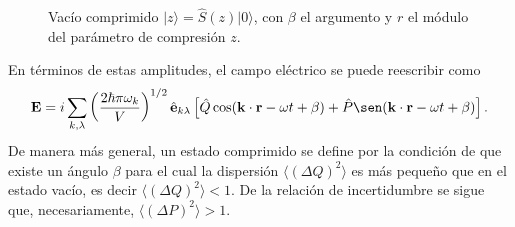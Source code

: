 \begin{figure}[!h]


  \caption{Vacío comprimido $\vert z \rangle = \hat{S}(z)\vert 0 \rangle$, con $\beta$ el argumento y $r$ el módulo del parámetro de compresión $z$.}
  \label{fig:squeezed-vacuum}
\end{figure}

En términos de estas amplitudes, el campo eléctrico se puede reescribir como
\begin{equation}
  \mathbf{E} = i \sum_{k,\lambda} \left( \frac{2\hbar \pi \omega_k}{V} \right)^{1/2} \hat{\mathbf{e}}_{k\lambda} \left[ \hat{Q}\cos(\mathbf{k}\cdot\mathbf{r} - \omega t + \beta) + \hat{P}\sen(\mathbf{k}\cdot\mathbf{r} - \omega t + \beta) \right].
\end{equation}
De manera más general, un estado comprimido se define por la condición de que existe un ángulo $\beta$ para el cual la dispersión $\langle (\Delta Q)^2 \rangle$ es más pequeño que en el estado vacío, es decir $\langle (\Delta Q)^2 \rangle < 1$. De la relación de incertidumbre se sigue que, necesariamente, $\langle (\Delta P)^2 \rangle > 1$.


